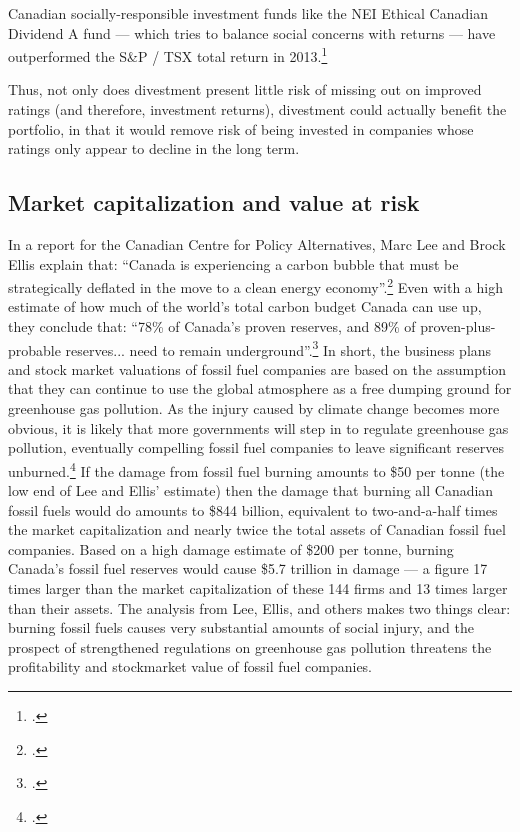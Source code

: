 Canadian socially-responsible investment funds like the NEI Ethical Canadian Dividend A fund --- which tries to balance social concerns with returns --- have outperformed the S\&P / TSX total return in 2013.\footcite[][]{HoldTheirOwn}



Thus, not only does divestment present little risk of missing out on improved ratings (and therefore, investment returns), divestment could actually benefit the portfolio, in that it would remove risk of being invested in companies whose ratings only appear to decline in the long term.



	\subsection {Market capitalization and value at risk}



In a report for the Canadian Centre for Policy Alternatives, Marc Lee and Brock Ellis explain that: ``Canada is experiencing a carbon bubble that must be strategically deflated in the move to a clean energy economy''.\footcite[][p.5]{CanadaCarbonLiabilities}
Even with a high estimate of how much of the world's total carbon budget Canada can use up, they conclude that: ``78\% of Canada’s proven reserves, and 89\% of proven-plus- probable reserves... need to remain underground''.\footcite[][p.6]{CanadaCarbonLiabilities}
In short, the business plans and stock market valuations of fossil fuel companies are based on the assumption that they can continue to use the global atmosphere as a free dumping ground for greenhouse gas pollution.
As the injury caused by climate change becomes more obvious, it is likely that more governments will step in to regulate greenhouse gas pollution, eventually compelling fossil fuel companies to leave significant reserves unburned.\footcite[See, for instance: ][]{ThreatenGrowth}
If the damage from fossil fuel burning amounts to \$50 per tonne (the low end of Lee and Ellis' estimate) then the damage that burning all Canadian fossil fuels would do amounts to \$844 billion, equivalent to two-and-a-half times the market capitalization and nearly twice the total assets of Canadian fossil fuel companies.
Based on a high damage estimate of \$200 per tonne, burning Canada's fossil fuel reserves would cause \$5.7 trillion in damage --- a figure 17 times larger than the market capitalization of these 144 firms and 13 times larger than their assets.
The analysis from Lee, Ellis, and others makes two things clear: burning fossil fuels causes very substantial amounts of social injury, and the prospect of strengthened regulations on greenhouse gas pollution threatens the profitability and stockmarket value of fossil fuel companies.



